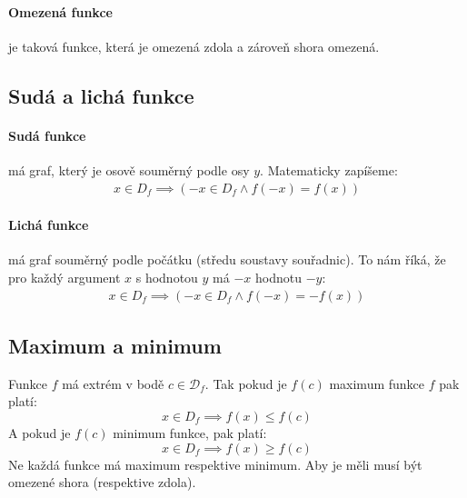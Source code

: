 \documentclass[12pt]{article}
\begin{document}
\paragraph{Omezená funkce} je taková funkce, která je omezená zdola a zároveň shora omezená.
\subsection{Sudá a lichá funkce}
\paragraph{Sudá funkce} má graf, který je osově souměrný podle osy $y$. Matematicky zapíšeme:
\begin{align}
x \in D_f \implies \left( -x \in D_f \land f(-x) = f(x) \right)
\end{align}
\paragraph{Lichá funkce} má graf souměrný podle počátku (středu soustavy souřadnic). To nám říká, že pro každý argument $x$ s hodnotou $y$ má $-x$ hodnotu $-y$:
\begin{align}
x \in D_f \implies \left( -x \in D_f \land f(-x) = - f(x) \right)
\end{align}
\subsection{Maximum a minimum}
Funkce $f$ má extrém v bodě $c \in \mathcal{D}_f$. Tak pokud je $f(c)$ maximum funkce $f$ pak platí:
\begin{equation}
x \in D_f \implies f(x) \leq f(c)
\end{equation}
A pokud je $f(c)$ minimum funkce, pak platí:
\begin{equation}
x \in D_f \implies f(x) \geq f(c)
\end{equation}
Ne každá funkce má maximum respektive minimum. Aby je měli musí být omezené shora (respektive zdola).
\end{document}
